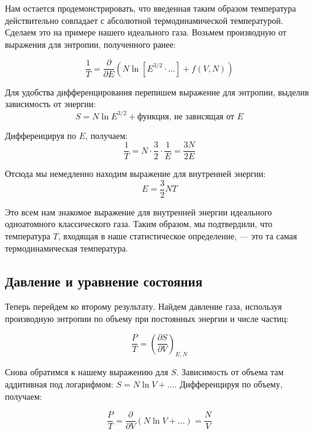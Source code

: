 \documentclass[../general/general]{subfiles}
\begin{document}
Нам остается продемонстрировать, что введенная таким образом температура действительно совпадает с абсолютной термодинамической температурой. Сделаем это на примере нашего идеального газа. Возьмем производную от выражения для энтропии, полученного ранее:

\begin{equation}
\frac{1}{T} = \frac{\partial}{\partial E} \left( N \ln \left[ E^{3/2} \cdot \dots \right] + f(V, N) \right)
\end{equation}

Для удобства дифференцирования перепишем выражение для энтропии, выделив зависимость от энергии:
\begin{equation}
S = N \ln E^{3/2} + \text{функция, не зависящая от } E
\end{equation}

Дифференцируя по $E$, получаем:
\begin{equation}
\frac{1}{T} = N \cdot \frac{3}{2} \cdot \frac{1}{E} = \frac{3N}{2E}
\end{equation}

Отсюда мы немедленно находим выражение для внутренней энергии:
\begin{equation}
E = \frac{3}{2} NT
\end{equation}

Это всем нам знакомое выражение для внутренней энергии идеального одноатомного классического газа. Таким образом, мы подтвердили, что температура $T$, входящая в наше статистическое определение, — это та самая термодинамическая температура.

\subsection{Давление и уравнение состояния}

Теперь перейдем ко второму результату. Найдем давление газа, используя производную энтропии по объему при постоянных энергии и числе частиц:

\begin{equation}
\frac{P}{T} = \left( \frac{\partial S}{\partial V} \right)_{E, N}
\end{equation}

Снова обратимся к нашему выражению для $S$. Зависимость от объема там аддитивная под логарифмом: $S = N \ln V + \dots$. Дифференцируя по объему, получаем:

\begin{equation}
\frac{P}{T} = \frac{\partial}{\partial V} (N \ln V + \dots) = \frac{N}{V}
\end{equation}
\end{document}
